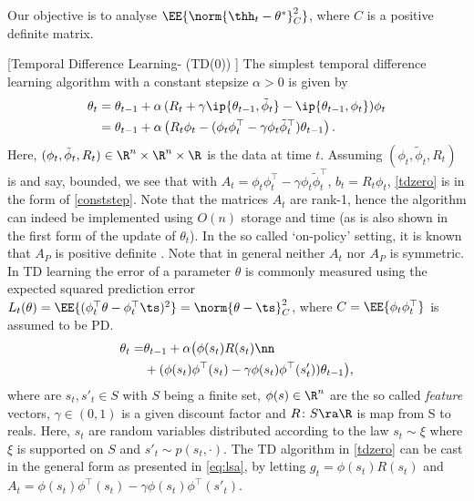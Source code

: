 Our objective is to analyse $\EE{\norm{\thh_t-\theta^*}_C^2}$, where $C$ is a positive definite matrix.

\begin{example}\label{ex:tdzero}[Temporal Difference Learning-  (TD(0)) ]
The simplest temporal difference learning algorithm with a constant stepsize $\alpha>0$ is given by
\begin{align}
\label{tdzero}
\begin{split}
\theta_t
& = \theta_{t-1}+\alpha\, (R_t+ \gamma \ip{\theta_{t-1},\tilde{\phi}_t } - \ip{\theta_{t-1},\phi_t})\phi_t \\
& = \theta_{t-1}+\alpha\, \bigl( R_t\phi_t- (\phi_t \phi_t^\top-\gamma \phi_t \tilde{\phi}_t^\top)\theta_{t-1}\bigr)\,.
\end{split}
\end{align}
Here, $(\phi_t,\tilde{\phi}_t,R_t)\in \R^n\times \R^n \times \R$ is the data at time $t$.
Assuming $(\phi_t,\tilde{\phi}_t,R_t)$ is \iid and say, bounded,
we see that with $A_t = \phi_t \phi_t^\top-\gamma \phi_t \tilde{\phi}_t^\top$, $b_t = R_t \phi_t$, \eqref{tdzero} is in the form of
\eqref{conststep}.
Note that the matrices $A_t$ are rank-1, hence the algorithm can indeed be implemented using $O(n)$ storage and
time (as is also shown in the first form of the update of $\theta_t$). In the so called `on-policy' setting, it is known that $A_P$ is positive definite \cite{}. Note that in general neither $A_t$ nor $A_P$ is symmetric.
In TD learning the error of a parameter $\theta$ is commonly measured using the expected squared
prediction error $L_t(\theta) = \EE{ (\phi_t^\top \theta - \phi_t^\top \ts)^2 } = \norm{\theta - \ts}_C^2$,
where $C = \EE{ \phi_t \phi_t^\top }$ is assumed to be PD.
\begin{align}\label{tdzero}
\theta_t=&\theta_{t-1}+\alpha \big(\phi(s_t) R(s_t)\nn\\&+ (\phi(s_t)\phi^\top(s_t)-\gamma \phi(s_t)\phi^\top(s'_t))\theta_{t-1}\big),
\end{align}
where are $s_t,s'_t\in S$ with $S$ being a finite set, $\phi(s)\in \R^n$ are the so called \emph{feature} vectors, $\gamma\in (0,1)$ is a given discount factor and $R\colon S\ra \R$ is map from S to reals. 
Here, $s_t$ are \iid random variables distributed according to the law $s_t\sim \xi$ where $\xi$ is supported on $S$ and $s'_t\sim p(s_t,\cdot)$. The TD algorithm in \eqref{tdzero} can be cast in the general form as presented in \eqref{eq:lsa}, by letting $g_t=\phi(s_t)R(s_t)$ and $A_t=\phi(s_t)\phi^\top(s_t)-\gamma \phi(s_t)\phi^\top(s'_t)$.
\fi
\end{example}

